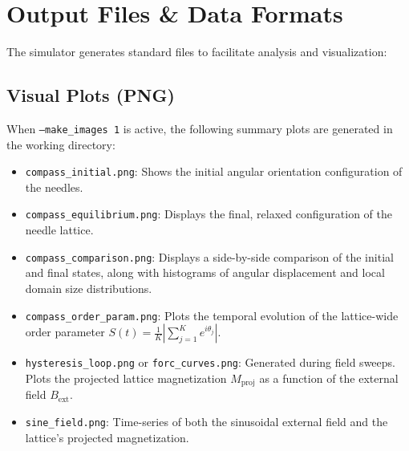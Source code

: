 \documentclass[11pt,a4paper]{article}
\newcommand{\code}[1]{\texttt{#1}}
\begin{document}
\section{Output Files \& Data Formats}
\label{sec:outputs}

The simulator generates standard files to facilitate analysis and visualization:

\subsection{Visual Plots (PNG)}
When \code{--make\_images 1} is active, the following summary plots are generated in the working directory:
\begin{itemize}
    \item \code{compass\_initial.png}: Shows the initial angular orientation configuration of the needles.
    \item \code{compass\_equilibrium.png}: Displays the final, relaxed configuration of the needle lattice.
    \item \code{compass\_comparison.png}: Displays a side-by-side comparison of the initial and final states, along with histograms of angular displacement and local domain size distributions.
    \item \code{compass\_order\_param.png}: Plots the temporal evolution of the lattice-wide order parameter $S(t) = \frac{1}{K} | \sum_{j=1}^K e^{i\theta_j} |$.
    \item \code{hysteresis\_loop.png} or \code{forc\_curves.png}: Generated during field sweeps. Plots the projected lattice magnetization $M_{\text{proj}}$ as a function of the external field $B_{\text{ext}}$.
    \item \code{sine\_field.png}: Time-series of both the sinusoidal external field and the lattice's projected magnetization.
\end{itemize}
\end{document}

